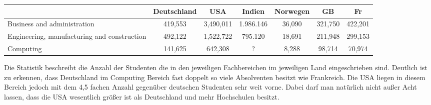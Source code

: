 \begin{table}[htp]
\begin{tabular}{|p{3cm}|c|c|c|c|c|c|}
\hline  	& Deutschland & USA & Indien  & Norwegen & GB & Fr \\ 
\hline  Business and administration & 419,553 & 3,490,011  & 1.986.146  & 36,090 & 321,750 & 422,201 \\ 
\hline  Engineering, manufacturing and construction & 492,122 & 1,522,722 & 795.120 & 18,691 & 211,948 & 299,153 \\ 
\hline  Computing &141,625  & 642,308 &? & 8,288 & 98,714 & 70,974\\ 
\hline 
\end{tabular} 
\end{table}
Die Statistik beschreibt die Anzahl der Studenten die in den jeweiligen Fachbereichen im jeweiligen Land eingeschrieben sind. Deutlich ist zu erkennen, dass Deutschland im Computing Bereich fast doppelt so viele Absolventen besitzt wie Frankreich. Die USA liegen in diesem Bereich jedoch mit dem 4,5 fachen Anzahl gegenüber deutschen Studenten sehr weit vorne. Dabei darf man natürlich nicht außer Acht lassen, dass die USA wesentlich größer ist als Deutschland und mehr Hochschulen besitzt.







